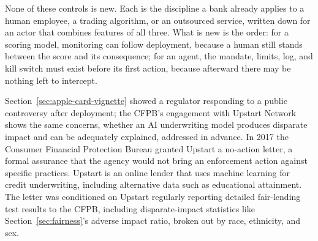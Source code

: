 \documentclass[../ai_in_finance]{subfiles}
\begin{document}
None of these controls is new. Each is the discipline a bank already applies to a human employee, a trading algorithm, or an outsourced service, written down for an actor that combines features of all three. What is new is the order: for a scoring model, monitoring can follow deployment, because a human still stands between the score and its consequence; for an agent, the mandate, limits, log, and kill switch must exist before its first action, because afterward there may be nothing left to intercept.

\label{sec:upstart-vignette}

Section~\ref{sec:apple-card-vignette} showed a regulator responding to a public controversy after deployment; the CFPB's engagement with Upstart Network shows the same concerns, whether an AI underwriting model produces disparate impact and can be adequately explained, addressed in advance. In 2017 the Consumer Financial Protection Bureau granted Upstart a no-action letter, a formal assurance that the agency would not bring an enforcement action against specific practices. Upstart is an online lender that uses machine learning for credit underwriting, including alternative data such as educational attainment. The letter was conditioned on Upstart regularly reporting detailed fair-lending test results to the CFPB, including disparate-impact statistics like Section~\ref{sec:fairness}'s adverse impact ratio, broken out by race, ethnicity, and sex.
\end{document}

